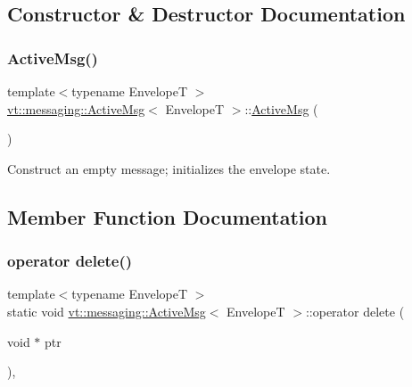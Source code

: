 \subsection{Constructor \& Destructor Documentation}
\mbox{\label{structvt_1_1messaging_1_1_active_msg_a5fd6a7b78c86b8f1e36198142990a4c4}} 
\subsubsection{\texorpdfstring{Active\+Msg()}{ActiveMsg()}}
{\footnotesize\ttfamily template$<$typename EnvelopeT $>$ \\
\hyperlink{structvt_1_1messaging_1_1_active_msg}{vt\+::messaging\+::\+Active\+Msg}$<$ EnvelopeT $>$\+::\hyperlink{structvt_1_1messaging_1_1_active_msg}{Active\+Msg} (\begin{DoxyParamCaption}{ }\end{DoxyParamCaption})\hspace{0.3cm}{\ttfamily [inline]}}



Construct an empty message; initializes the envelope state. 



\subsection{Member Function Documentation}
\mbox{\label{structvt_1_1messaging_1_1_active_msg_a37cd0731f99157266333772f501d390d}} 
\subsubsection{\texorpdfstring{operator delete()}{operator delete()}}
{\footnotesize\ttfamily template$<$typename EnvelopeT $>$ \\
static void \hyperlink{structvt_1_1messaging_1_1_active_msg}{vt\+::messaging\+::\+Active\+Msg}$<$ EnvelopeT $>$\+::operator delete (\begin{DoxyParamCaption}\item[{void $\ast$}]{ptr }\end{DoxyParamCaption})\hspace{0.3cm}{\ttfamily [inline]}, {\ttfamily [static]}}

